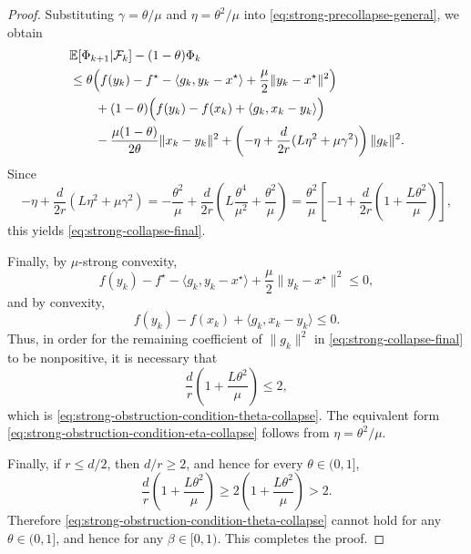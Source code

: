 \documentclass[10pt]{article}
\begin{document}
\begin{proof}
Substituting \(\gamma=\theta/\mu\) and \(\eta=\theta^2/\mu\) into
\eqref{eq:strong-precollapse-general}, we obtain
\begin{align}
&\mathbb E\!\left[\Phi_{k+1}\middle|\mathcal F_k\right]-(1-\theta)\Phi_k
\notag\\
&\le
\theta\Bigl(
f(y_k)-f^\star-\langle g_k,y_k-x^\star\rangle+\frac{\mu}{2}\|y_k-x^\star\|^2
\Bigr)
\notag\\
&\qquad
+(1-\theta)\Bigl(
f(y_k)-f(x_k)+\langle g_k,x_k-y_k\rangle
\Bigr)
\notag\\
&\qquad
-\frac{\mu(1-\theta)}{2\theta}\|x_k-y_k\|^2
+\left(
-\eta+\frac{d}{2r}(L\eta^2+\mu\gamma^2)
\right)\|g_k\|^2.
\label{eq:strong-after-matching}
\end{align}
Since
\[
-\eta+\frac{d}{2r}(L\eta^2+\mu\gamma^2)
=
-\frac{\theta^2}{\mu}
+\frac{d}{2r}
\left(
L\frac{\theta^4}{\mu^2}
+
\frac{\theta^2}{\mu}
\right)
=
\frac{\theta^2}{\mu}
\left[
-1+\frac{d}{2r}\left(1+\frac{L\theta^2}{\mu}\right)
\right],
\]
this yields \eqref{eq:strong-collapse-final}.

Finally, by \(\mu\)-strong convexity,
\[
f(y_k)-f^\star-\langle g_k,y_k-x^\star\rangle+\frac{\mu}{2}\|y_k-x^\star\|^2\le 0,
\]
and by convexity,
\[
f(y_k)-f(x_k)+\langle g_k,x_k-y_k\rangle\le 0.
\]
Thus, in order for the remaining coefficient of \(\|g_k\|^2\) in
\eqref{eq:strong-collapse-final} to be nonpositive, it is necessary that
\[
\frac{d}{r}\left(1+\frac{L\theta^2}{\mu}\right)\le 2,
\]
which is \eqref{eq:strong-obstruction-condition-theta-collapse}. The equivalent form
\eqref{eq:strong-obstruction-condition-eta-collapse} follows from \(\eta=\theta^2/\mu\).

Finally, if \(r\le d/2\), then \(d/r\ge2\), and hence for every \(\theta\in(0,1]\),
\[
\frac{d}{r}\left(1+\frac{L\theta^2}{\mu}\right)
\ge
2\left(1+\frac{L\theta^2}{\mu}\right)
>
2.
\]
Therefore \eqref{eq:strong-obstruction-condition-theta-collapse} cannot hold for any
\(\theta\in(0,1]\), and hence for any \(\beta\in[0,1)\).
This completes the proof.

\end{proof}
\end{document}
